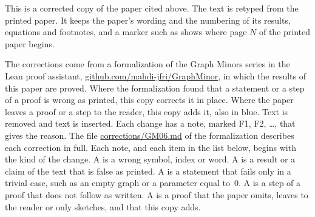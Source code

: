 
This is a corrected copy of the paper cited above. The text is retyped from the printed paper.
It keeps the paper's wording and the numbering of its results, equations and footnotes, and a
marker such as  shows where page $N$ of the printed paper begins.

The corrections come from a formalization of the Graph Minors series in the Lean proof
assistant, \href{https://github.com/mahdi-jfri/GraphMinor}{github.com/mahdi-jfri/GraphMinor},
in which the results of this paper are proved. Where the formalization found that a statement
or a step of a proof is wrong as printed, this copy corrects it in place. Where the paper leaves a proof or a step to the reader, this copy adds it, also in blue. Text  is removed and text  is inserted. Each change has a note, marked
\textcolor{fixcolor}{\sffamily F1}, \textcolor{fixcolor}{\sffamily F2}, \dots, that gives the
reason. The file
\href{https://github.com/mahdi-jfri/GraphMinor/blob/main/corrections/GM06.md}{corrections/GM06.md}
of the formalization describes each correction in full. Each note, and each item in the list below, begins with the kind of the change. A  is a wrong symbol, index or word. A  is a result or a claim of the text that is false as printed. A  is a statement that fails only in a trivial case, such as an empty graph or a parameter equal to~$0$. A  is a step of a proof that does not follow as written. A  is a proof that the paper omits, leaves to the reader or only sketches, and that this copy adds.

